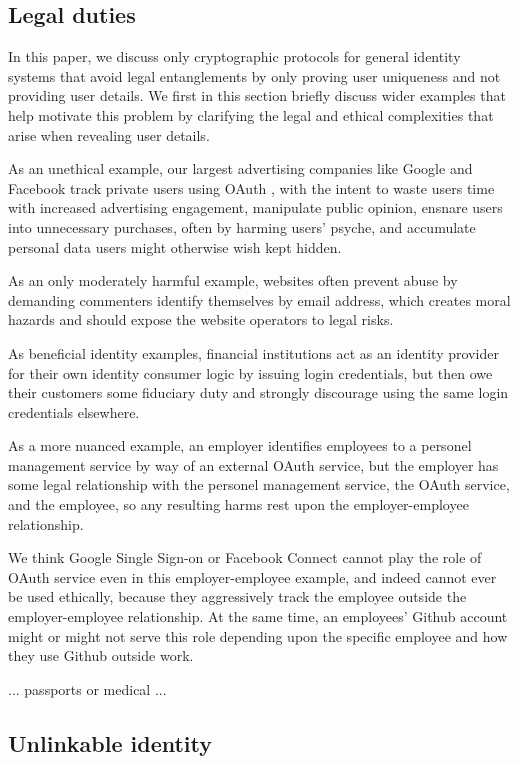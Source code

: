 \subsection{Legal duties}

In this paper, we discuss only cryptographic protocols for general identity systems that avoid legal entanglements by only proving user uniqueness and not providing user details.  We first in this section briefly discuss wider examples that help motivate this problem by clarifying the legal and ethical complexities that arise when revealing user details.

As an unethical example, our largest advertising companies like Google and Facebook track private users using OAuth \cite{oauth}, with the intent to waste users time with increased advertising engagement, manipulate public opinion, ensnare users into unnecessary purchases, often by harming users' psyche, and accumulate personal data users might otherwise wish kept hidden.

As an only moderately harmful example, websites often prevent abuse by demanding commenters identify themselves by email address, which creates moral hazards and should expose the website operators to legal risks.

As beneficial identity examples, financial institutions act as an identity provider for their own identity consumer logic by issuing login credentials, but then owe their customers some fiduciary duty and strongly discourage using the same login credentials elsewhere.  

As a more nuanced example, an employer identifies employees to a personel management service by way of an external OAuth service, but the employer has some legal relationship with the personel management service, the OAuth service, and the employee, so any resulting harms rest upon the employer-employee relationship.  

We think Google Single Sign-on or Facebook Connect cannot play the role of OAuth service even in this employer-employee example, and indeed cannot ever be used ethically, because they aggressively track the employee outside the employer-employee relationship.  At the same time, an employees' Github account might or might not serve this role depending upon the specific employee and how they use Github outside work.  

... passports or medical ...

\subsection{Unlinkable identity}

